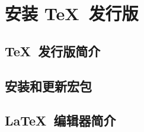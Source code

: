 \chapter{安装 \protect\TeX\ 发行版}\label{app:install}

\leavevmode\nobreakspace

\section{\protect\TeX\ 发行版简介}\label{sec:dists}

\leavevmode\nobreakspace

\section{安装和更新宏包}\label{sec:pkg-manager}

\leavevmode\nobreakspace

\section{\LaTeX\ 编辑器简介}\label{sec:editor}

\leavevmode\nobreakspace

\endinput